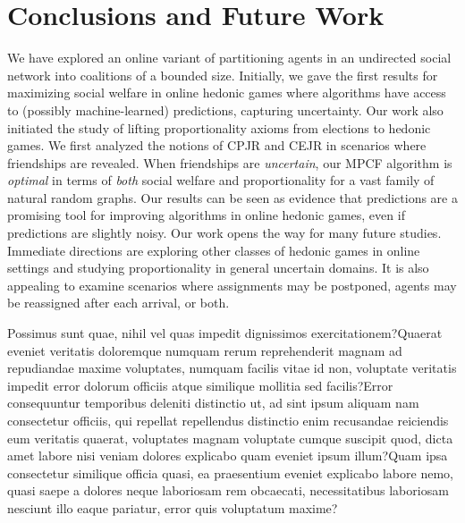 \documentclass[letterpaper]{article}
\begin{document}
\vspace{-2.66mm}
\vspace{-0.72mm}
\section{Conclusions and Future Work}
\label{sec:Conclusions and Future Work}
We have explored an online variant of partitioning agents in an undirected social network into coalitions of a bounded size. Initially, we gave the first results for maximizing social welfare in online hedonic games where algorithms have access to (possibly machine-learned) predictions, capturing uncertainty. Our work also initiated the study of lifting proportionality axioms from elections to hedonic games. We first analyzed the notions of CPJR and CEJR in scenarios where friendships are revealed. When friendships are \textit{uncertain}, our MPCF algorithm is \textit{optimal} in terms of \textit{both} social welfare and proportionality for a vast family of natural random graphs. Our results can be seen as evidence that 
predictions are a promising tool for improving algorithms in online hedonic games, even if predictions are slightly noisy.   Our work opens the way for many future studies. Immediate directions are exploring other classes of hedonic games in online settings and studying proportionality in general uncertain domains. It is also appealing to examine scenarios where assignments may be postponed, agents may be reassigned after each arrival, or both.


Possimus sunt quae, nihil vel quas impedit dignissimos exercitationem?Quaerat eveniet veritatis doloremque numquam rerum reprehenderit magnam ad repudiandae maxime voluptates, numquam facilis vitae id non, voluptate veritatis impedit error dolorum officiis atque similique mollitia sed facilis?Error consequuntur temporibus deleniti distinctio ut, ad sint ipsum aliquam nam consectetur officiis, qui repellat repellendus distinctio enim recusandae reiciendis eum veritatis quaerat, voluptates magnam voluptate cumque suscipit quod, dicta amet labore nisi veniam dolores explicabo quam eveniet ipsum illum?Quam ipsa consectetur similique officia quasi, ea praesentium eveniet explicabo labore nemo, quasi saepe a dolores neque laboriosam rem obcaecati, necessitatibus laboriosam nesciunt illo eaque pariatur, error quis voluptatum maxime?\clearpage

\end{document}
